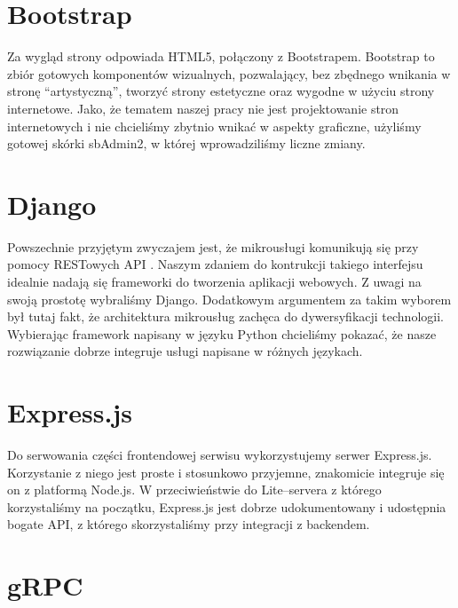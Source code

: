 \documentclass[licencjacka]{pracamgr}
\begin{document}
\section{Bootstrap}

Za wygląd strony odpowiada HTML5, połączony z Bootstrapem.
Bootstrap to zbiór gotowych komponentów wizualnych, pozwalający, bez zbędnego wnikania
w stronę ``artystyczną'', tworzyć strony estetyczne oraz wygodne w użyciu strony internetowe.
Jako, że tematem naszej pracy nie jest projektowanie stron internetowych i nie chcieliśmy zbytnio wnikać w aspekty graficzne,
użyliśmy gotowej skórki sbAdmin2, w której wprowadziliśmy liczne zmiany.

\section{Django}

Powszechnie przyjętym zwyczajem jest, że mikrousługi komunikują się przy pomocy
RESTowych API \cite{mammatustech}. Naszym zdaniem do kontrukcji takiego interfejsu
idealnie nadają się frameworki do tworzenia aplikacji webowych. Z uwagi na swoją
prostotę wybraliśmy Django. Dodatkowym argumentem za takim wyborem był tutaj fakt,
że architektura mikrousług zachęca do dywersyfikacji technologii. Wybierając
framework napisany w języku Python chcieliśmy pokazać, że nasze rozwiązanie dobrze
integruje usługi napisane w różnych językach.

\section{Express.js}

Do serwowania części frontendowej serwisu wykorzystujemy serwer Express.js.
Korzystanie z niego jest proste i stosunkowo przyjemne, znakomicie integruje się
on z platformą Node.js. W przeciwieństwie do Lite--servera z którego korzystaliśmy
na początku, Express.js jest dobrze udokumentowany i udostępnia bogate API, z którego
skorzystaliśmy przy integracji z backendem.

\section{gRPC}
\end{document}
